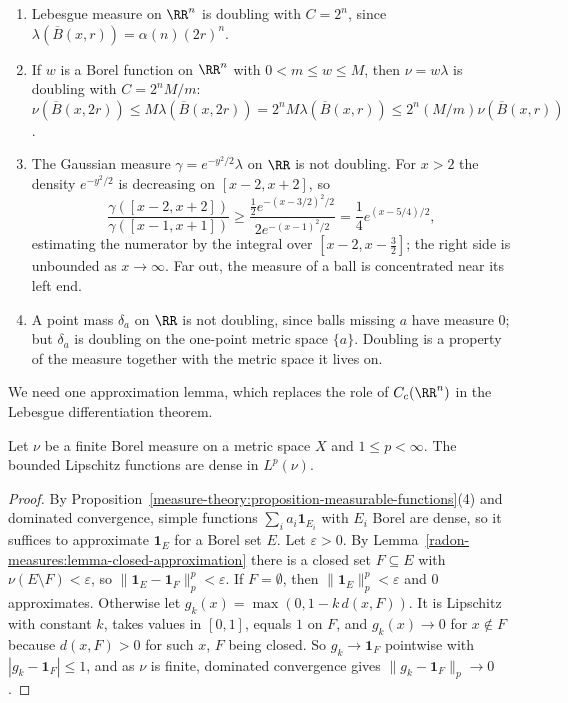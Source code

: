 \begin{example}\label{radon-measures:example-doubling}
\begin{enumerate}
\item Lebesgue measure on $\RR^n$ is doubling with $C = 2^n$, since $\lambda(\overline{B}(x, r)) = \alpha(n)(2r)^n$.
\item If $w$ is a Borel function on $\RR^n$ with $0 < m \leq w \leq M$, then $\nu = w\lambda$ is doubling with $C = 2^nM/m$:
$\nu(\overline{B}(x, 2r)) \leq M\lambda(\overline{B}(x, 2r)) = 2^nM\lambda(\overline{B}(x, r)) \leq 2^n(M/m)\nu(\overline{B}(x, r))$.
\item The Gaussian measure $\gamma = e^{-y^2/2}\lambda$ on $\RR$ is not doubling. For $x > 2$ the density $e^{-y^2/2}$ is decreasing on $[x - 2, x + 2]$, so
\[
\frac{\gamma([x - 2, x + 2])}{\gamma([x - 1, x + 1])} \geq \frac{\frac12e^{-(x - 3/2)^2/2}}{2e^{-(x - 1)^2/2}} = \frac14e^{(x - 5/4)/2},
\]
estimating the numerator by the integral over $[x - 2, x - \frac32]$; the right side is unbounded as $x \to \infty$. Far out, the measure of a ball is concentrated near its left end.
\item A point mass $\delta_a$ on $\RR$ is not doubling, since balls missing $a$ have measure $0$; but $\delta_a$ is doubling on the one-point metric space $\{a\}$. Doubling is a property of the measure
together with the metric space it lives on.
\end{enumerate}
\end{example}

We need one approximation lemma, which replaces the role of $C_c(\RR^n)$ in the Lebesgue differentiation theorem.

\begin{lemma}\label{radon-measures:lemma-lipschitz-dense}
Let $\nu$ be a finite Borel measure on a metric space $X$ and $1 \leq p < \infty$. The bounded Lipschitz functions are dense in $L^p(\nu)$.
\end{lemma}

\begin{proof}
By Proposition~\ref{measure-theory:proposition-measurable-functions}(4) and dominated convergence, simple functions $\sum_ia_i\mathbf{1}_{E_i}$ with $E_i$ Borel are dense, so it suffices to approximate
$\mathbf{1}_E$ for a Borel set $E$. Let $\varepsilon > 0$. By Lemma~\ref{radon-measures:lemma-closed-approximation} there is a closed set $F \subseteq E$ with $\nu(E \setminus F) < \varepsilon$, so
$\|\mathbf{1}_E - \mathbf{1}_F\|_p^p < \varepsilon$. If $F = \emptyset$, then $\|\mathbf{1}_E\|_p^p < \varepsilon$ and $0$ approximates. Otherwise let $g_k(x) = \max(0, 1 - k\,d(x, F))$. It is Lipschitz with constant $k$, takes values in $[0, 1]$,
equals $1$ on $F$, and $g_k(x) \to 0$ for $x \notin F$ because $d(x, F) > 0$ for such $x$, $F$ being closed. So $g_k \to \mathbf{1}_F$ pointwise with $|g_k - \mathbf{1}_F| \leq 1$, and as $\nu$ is finite,
dominated convergence gives $\|g_k - \mathbf{1}_F\|_p \to 0$.
\end{proof}

